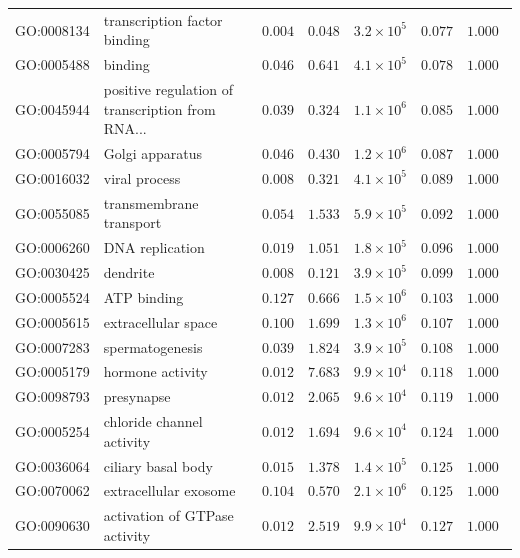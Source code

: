 \documentclass{article}
\begin{document}
\begin{center}
\begin{longtable*}{|l|l|r|r|r|r|r|}
            GO:0008134 & transcription factor binding & $ 0.004$ & $ 0.048$ & $3.2\times 10^{5}$ & $ 0.077$ & $ 1.000~~$ \\
            GO:0005488 & binding & $ 0.046$ & $ 0.641$ & $4.1\times 10^{5}$ & $ 0.078$ & $ 1.000~~$ \\
            GO:0045944 & positive regulation of transcription from RNA... & $ 0.039$ & $ 0.324$ & $1.1\times 10^{6}$ & $ 0.085$ & $ 1.000~~$ \\
            GO:0005794 & Golgi apparatus & $ 0.046$ & $ 0.430$ & $1.2\times 10^{6}$ & $ 0.087$ & $ 1.000~~$ \\
            GO:0016032 & viral process & $ 0.008$ & $ 0.321$ & $4.1\times 10^{5}$ & $ 0.089$ & $ 1.000~~$ \\
            GO:0055085 & transmembrane transport & $ 0.054$ & $ 1.533$ & $5.9\times 10^{5}$ & $ 0.092$ & $ 1.000~~$ \\
            GO:0006260 & DNA replication & $ 0.019$ & $ 1.051$ & $1.8\times 10^{5}$ & $ 0.096$ & $ 1.000~~$ \\
            GO:0030425 & dendrite & $ 0.008$ & $ 0.121$ & $3.9\times 10^{5}$ & $ 0.099$ & $ 1.000~~$ \\
            GO:0005524 & ATP binding & $ 0.127$ & $ 0.666$ & $1.5\times 10^{6}$ & $ 0.103$ & $ 1.000~~$ \\
            GO:0005615 & extracellular space & $ 0.100$ & $ 1.699$ & $1.3\times 10^{6}$ & $ 0.107$ & $ 1.000~~$ \\
            GO:0007283 & spermatogenesis & $ 0.039$ & $ 1.824$ & $3.9\times 10^{5}$ & $ 0.108$ & $ 1.000~~$ \\
            GO:0005179 & hormone activity & $ 0.012$ & $ 7.683$ & $9.9\times 10^{4}$ & $ 0.118$ & $ 1.000~~$ \\
            GO:0098793 & presynapse & $ 0.012$ & $ 2.065$ & $9.6\times 10^{4}$ & $ 0.119$ & $ 1.000~~$ \\
            GO:0005254 & chloride channel activity & $ 0.012$ & $ 1.694$ & $9.6\times 10^{4}$ & $ 0.124$ & $ 1.000~~$ \\
            GO:0036064 & ciliary basal body & $ 0.015$ & $ 1.378$ & $1.4\times 10^{5}$ & $ 0.125$ & $ 1.000~~$ \\
            GO:0070062 & extracellular exosome & $ 0.104$ & $ 0.570$ & $2.1\times 10^{6}$ & $ 0.125$ & $ 1.000~~$ \\
            GO:0090630 & activation of GTPase activity & $ 0.012$ & $ 2.519$ & $9.9\times 10^{4}$ & $ 0.127$ & $ 1.000~~$ \\

\end{longtable*}
\end{center}
\end{document}
